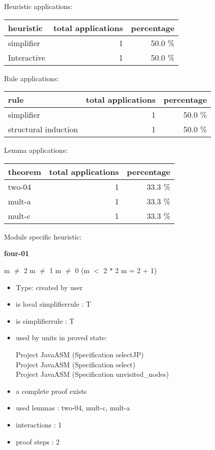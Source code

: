 \documentclass[a4paper]{article}
\begin{document}
\medskip


Heuristic applications:

\begin{supertabular}{l|r|r}
heuristic	& total applications & percentage \\ \hline
simplifier & 1 & 50.0 \% \\
Interactive & 1 & 50.0 \% \\

\end{supertabular}

Rule applications:

\begin{supertabular}{l|r|r}
rule	        & total applications & percentage \\ \hline
simplifier & 1 & 50.0 \% \\
structural induction & 1 & 50.0 \% \\

\end{supertabular}

Lemma applications:

\begin{supertabular}{l|r|r}
theorem	        & total applications & percentage \\ \hline
two-04 & 1 & 33.3 \% \\
mult-a & 1 & 33.3 \% \\
mult-c & 1 & 33.3 \% \\

\end{supertabular}

Module specific heuristic:

\pagebreak

{\LARGE\bf four-01}\label{lemma-four-01}

\medskip

 \Fol m $\neq$ 2 \And m $\neq$ 1 \And m $\neq$ 0 \Imp (m $<$ 2 $*$ 2 \Equiv m = 2 + 1)

\begin{itemize}

\item Type: created by user

\item is local simplifierrule : T
\item is simplifierrule : T
\item used by units in proved state:

Project JavaASM (Specification selectJP) \\
Project JavaASM (Specification select) \\
Project JavaASM (Specification unvisited\_nodes)
\item       a complete proof exists
\item       used lemmas  : two-04, mult-c, mult-a
\item       interactions : 1
\item       proof steps  : 2
\end{itemize}
\end{document}
